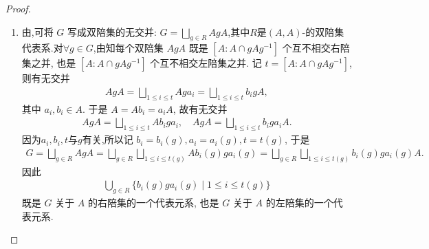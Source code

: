 \documentclass[../../main.tex]{subfiles}%
\begin{document}
\begin{proof}
\begin{enumerate}[(1)]
\item 由,可将 $G$ 写成双陪集的无交并: $G = \bigsqcup_{g\in R} AgA$,其中$R$是$(A,A)$-的双陪集代表系.对$\forall g\in G$,由知每个双陪集 $AgA$ 既是 $[A:A\cap gAg^{-1}]$ 个互不相交右陪集之并, 也是 $[A:A\cap gAg^{-1}]$ 个互不相交左陪集之并. 记 $t = [A:A\cap gAg^{-1}]$, 则有无交并
\begin{align*}
AgA = \bigsqcup_{1\leqslant i\leqslant t} Aga_i = \bigsqcup_{1\leqslant i\leqslant t} b_igA,
\end{align*}
其中 $a_i, b_i \in A$. 于是 $A = Ab_i = a_iA$, 故有无交并
\begin{align*}
AgA = \bigsqcup_{1\leqslant i\leqslant t} Ab_iga_i,\quad AgA = \bigsqcup_{1\leqslant i\leqslant t} b_iga_iA.
\end{align*}
因为$a_i,b_i,t$与$g$有关,所以记 $b_i = b_i(g), a_i = a_i(g), t = t(g)$, 于是
\begin{align*}
G=\bigsqcup_{g\in R}{AgA}=\bigsqcup_{g\in R}{\bigsqcup_{1\leqslant i\leqslant t\left( g \right)}{Ab_i\left( g \right) ga_i\left( g \right)}}=\bigsqcup_{g\in R}{\bigsqcup_{1\leqslant i\leqslant t\left( g \right)}{b_i\left( g \right) ga_i\left( g \right) A}}.
\end{align*}
因此
\begin{align*}
\bigcup_{g\in R} \{ b_i(g)ga_i(g) \mid 1 \leqslant i \leqslant t(g) \}
\end{align*}
既是 $G$ 关于 $A$ 的右陪集的一个代表元系, 也是 $G$ 关于 $A$ 的左陪集的一个代表元系.
\end{enumerate}
\end{proof}
\end{document}
